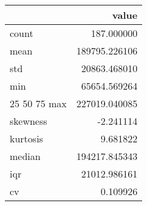 \begin{tabular}{lr}
\toprule
 & value \\
\midrule
count & 187.000000 \\
mean & 189795.226106 \\
std & 20863.468010 \\
min & 65654.569264 \\
25%
50%
75%
max & 227019.040085 \\
skewness & -2.241114 \\
kurtosis & 9.681822 \\
median & 194217.845343 \\
iqr & 21012.986161 \\
cv & 0.109926 \\
\bottomrule
\end{tabular}
